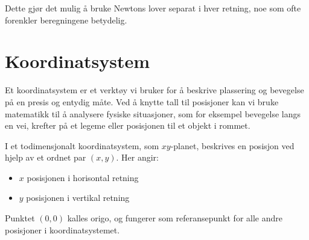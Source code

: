 Dette gjør det mulig å bruke Newtons lover separat i hver retning, noe som ofte forenkler beregningene betydelig.


\section{Koordinatsystem}

Et koordinatsystem er et verktøy vi bruker for å beskrive plassering og bevegelse på en presis og entydig måte. Ved å knytte tall til posisjoner kan vi bruke matematikk til å analysere fysiske situasjoner, som for eksempel bevegelse langs en vei, krefter på et legeme eller posisjonen til et objekt i rommet.\\



I et todimensjonalt koordinatsystem, som $xy$-planet, beskrives en posisjon ved hjelp av et ordnet par $(x,y)$. Her angir:
\begin{itemize}
    \item $x$ posisjonen i horisontal retning
    \item $y$ posisjonen i vertikal retning
\end{itemize}

Punktet $(0,0)$ kalles origo, og fungerer som referansepunkt for alle andre posisjoner i koordinatsystemet.


